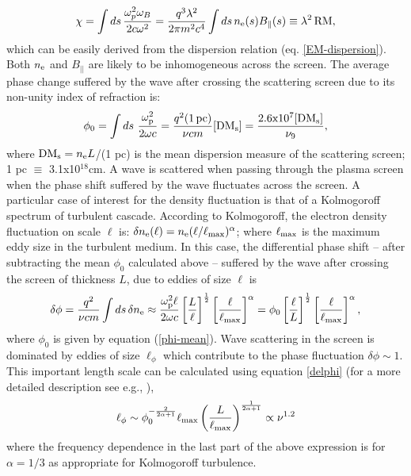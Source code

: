 \documentclass[fleqn,usenatbib]{mnras}
\begin{document}
	\begin{equation}
		\chi = \int ds\, {\omega_p^2\omega_B\over 2c\omega^2} = {q^3\lambda^2\over 2\pi m^2 c^4}\int ds\, n_{\rm e}(s) B_\parallel(s) \equiv \lambda^2\,{\rm RM},
		\label{chi-mean}
	\end{equation}
	which can be easily derived from the dispersion relation (eq. \ref{EM-dispersion}). Both $n_{\rm e}$ and $B_{||}$ are likely to be inhomogeneous across the screen. The average phase change suffered by the wave after crossing the scattering screen due to its non-unity index of refraction is:
	\begin{equation}
		\phi_0 = \int ds\,\, {\omega_{\rm p}^2 \over2\omega c} = {q^2 ({\rm 1\, pc})\over \nu c m} [{\rm DM_{\rm s}}] = {2.6{\rm x}10^{7} [{\rm DM_{\rm s}}]\over \nu_9},
		\label{phi-mean}
	\end{equation}
	where ${\rm DM_{\rm s}}=n_{\rm e}L$/(1 pc) is the mean dispersion measure of the scattering screen; 1 pc $\equiv$ 3.1x10$^{18}$cm. A wave is scattered when passing through the plasma screen when the phase shift suffered by the wave fluctuates across the screen. 
	A particular case of interest for the density fluctuation is that of a Kolmogoroff spectrum of turbulent cascade. According to Kolmogoroff, the electron density fluctuation on scale $\ell$ is: $\delta n_{\rm e}(\ell)=n_{\rm e}(\ell/\ell_{\rm max})^{\alpha}$; where $\ell_{\rm max}$ is the maximum eddy size in the turbulent medium. In this case, the differential phase shift -- after subtracting the mean $\phi_0$ calculated above -- suffered by the wave after crossing the screen of thickness $L$, due to eddies of size $\ell$ is
	\begin{equation}
		\delta\phi = {q^2\over \nu c m}\int ds\, \delta n_{\rm e} \approx {\omega_{\rm p}^2\ell\over 2\omega c}\left[{L\over \ell}\right]^{1\over 2} \left[{\ell\over \ell_{\rm max}}\right]^{\alpha} = \phi_0 \left[{\ell\over L}\right]^{1\over 2} \left[{\ell\over \ell_{\rm max}}\right]^{\alpha}
		\label{delphi},
	\end{equation}
	where $\phi_0$ is given by equation (\ref{phi-mean}). Wave scattering in the screen is dominated by eddies of size $\ell_\phi$ which contribute to the phase fluctuation $\delta\phi\sim 1$. This important length scale can be calculated using equation \ref{delphi}  (for a more detailed description see e.g., \cite{BK2020}),
	\begin{equation}
		\label{eq:lpi}
		\ell_\phi \sim \phi_0^{-{2\over2\alpha+1}} \ell_{\rm max} \left({L\over \ell_{\rm max}}\right) ^{{1\over 2\alpha+1}} \propto \nu^{1.2}
	\end{equation}
	where the frequency dependence in the last part of the above expression is for $\alpha=1/3$ as appropriate for Kolmogoroff turbulence.
	
\end{document}

